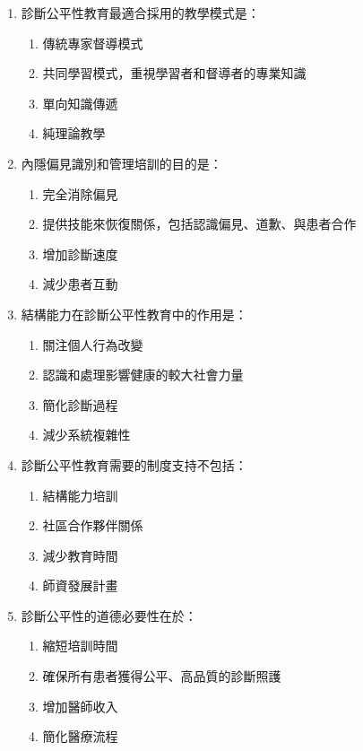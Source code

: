 \documentclass[12pt,a4paper]{article}
\begin{document}
\begin{enumerate}
    \item 診斷公平性教育最適合採用的教學模式是：
    \begin{enumerate}[label=\alph*)]
        \item 傳統專家督導模式
        \item 共同學習模式，重視學習者和督導者的專業知識
        \item 單向知識傳遞
        \item 純理論教學
    \end{enumerate}

    \item 內隱偏見識別和管理培訓的目的是：
    \begin{enumerate}[label=\alph*)]
        \item 完全消除偏見
        \item 提供技能來恢復關係，包括認識偏見、道歉、與患者合作
        \item 增加診斷速度
        \item 減少患者互動
    \end{enumerate}

    \item 結構能力在診斷公平性教育中的作用是：
    \begin{enumerate}[label=\alph*)]
        \item 關注個人行為改變
        \item 認識和處理影響健康的較大社會力量
        \item 簡化診斷過程
        \item 減少系統複雜性
    \end{enumerate}

    \item 診斷公平性教育需要的制度支持不包括：
    \begin{enumerate}[label=\alph*)]
        \item 結構能力培訓
        \item 社區合作夥伴關係
        \item 減少教育時間
        \item 師資發展計畫
    \end{enumerate}

    \item 診斷公平性的道德必要性在於：
    \begin{enumerate}[label=\alph*)]
        \item 縮短培訓時間
        \item 確保所有患者獲得公平、高品質的診斷照護
        \item 增加醫師收入
        \item 簡化醫療流程
    \end{enumerate}
\end{enumerate}
\end{document}
